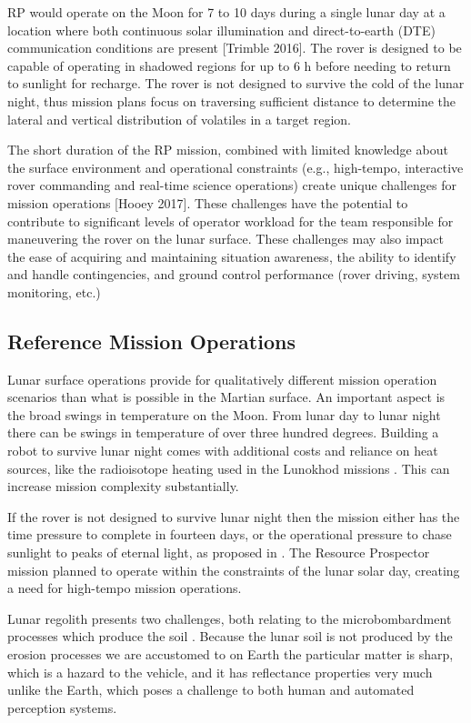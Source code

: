 \documentclass[twocolumn,letterpaper]{IEEEAerospaceCLS}  %
\begin{document}
RP would operate on the Moon for 7 to 10 days during a single lunar day at a location where both continuous solar illumination and direct-to-earth (DTE) communication conditions are present [Trimble 2016]. The rover is designed to be capable of operating in shadowed regions for up to 6 h before needing to return to sunlight for recharge. The rover is not designed to survive the cold of the lunar night, thus mission plans focus on traversing sufficient distance to determine the lateral and vertical distribution of volatiles in a target region.

The short duration of the RP mission, combined with limited knowledge about the surface environment and operational constraints (e.g., high-tempo, interactive rover commanding and real-time science operations) create unique challenges for mission operations [Hooey 2017]. These challenges have the potential to contribute to significant levels of operator workload for the team responsible for maneuvering the rover on the lunar surface. These challenges may also impact the ease of acquiring and maintaining situation awareness, the ability to identify and handle contingencies, and ground control performance (rover driving, system monitoring, etc.)

\subsection{Reference Mission Operations}
Lunar surface operations provide for qualitatively different mission operation scenarios than what is possible in the Martian surface.  An important aspect is the broad swings in temperature on the Moon.  From lunar day to lunar night there can be swings in temperature of over three hundred degrees.  Building a robot to survive lunar night comes with additional costs and reliance on heat sources, like the radioisotope heating used in the Lunokhod missions \cite{ulamec2010survive}.  This can increase mission complexity substantially.  

If the rover is not designed to survive lunar night then the mission either has the time pressure to complete in fourteen days, or the operational pressure to chase sunlight to peaks of eternal light, as proposed in \cite{otten2018strategic}.  The Resource Prospector mission planned to operate within the constraints of the lunar solar day, creating a need for high-tempo mission operations. 

Lunar regolith presents two challenges, both relating to the microbombardment processes which produce the soil \cite{XXX}.  Because the lunar soil is not produced by the erosion processes we are accustomed to on Earth the particular matter is sharp, which is a hazard to the vehicle, and it has reflectance properties very much unlike the Earth, which poses a challenge to both human and automated perception systems. 
\end{document}
